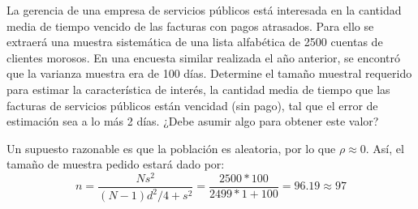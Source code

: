 
\addpoints 
\question[15] La gerencia de una empresa de servicios públicos está interesada en la cantidad media de tiempo vencido de las facturas con pagos atrasados. Para ello se extraerá una muestra sistemática de una lista alfabética de 2500 cuentas de clientes morosos. En una encuesta similar realizada el año anterior, se encontró que la varianza muestra era de 100 días. Determine el tamaño muestral requerido para estimar la característica de interés, la cantidad media de tiempo que las facturas de servicios públicos están vencidad (sin pago), tal que el error de estimación sea a lo más 2 días. ¿Debe asumir algo para obtener este valor?

\begin{solution}
Un supuesto razonable es que la población es aleatoria, por lo que $\rho\approx 0$. Así, el tamaño de muestra pedido estará dado por:
$$n=\dfrac{Ns^2}{(N-1)d^2/4+s^2}=\dfrac{2500*100}{2499*1+100}=96.19\approx 97$$
\end{solution}